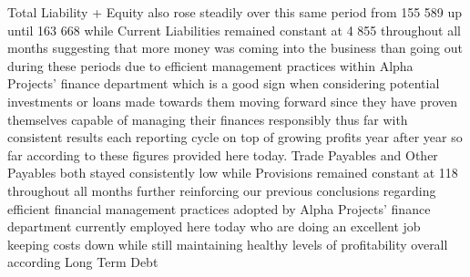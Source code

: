 Total Liability + Equity also rose steadily over this same period from 155 589 up until 163 668 while Current Liabilities remained constant at 4 855 throughout all months suggesting that more money was coming into the business than going out during these periods due to efficient management practices within Alpha Projects’ finance department which is a good sign when considering potential investments or loans made towards them moving forward since they have proven themselves capable of managing their finances responsibly thus far with consistent results each reporting cycle on top of growing profits year after year so far according to these figures provided here today. Trade Payables and Other Payables both stayed consistently low while Provisions remained constant at 118 throughout all months further reinforcing our previous conclusions regarding efficient financial management practices adopted by Alpha Projects’ finance department currently employed here today who are doing an excellent job keeping costs down while still maintaining healthy levels of profitability overall according Long Term Debt